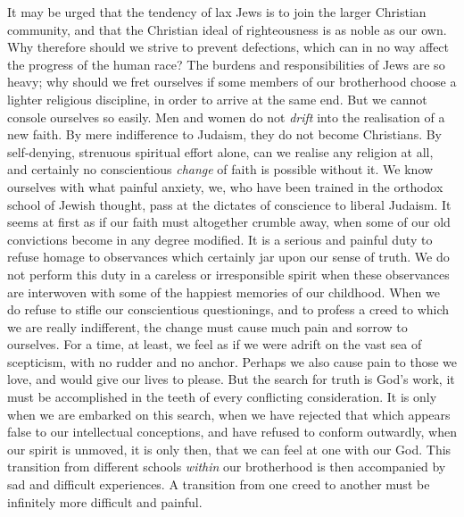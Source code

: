 It may be urged that the tendency of lax
Jews is to join the larger Christian community,
and that the Christian ideal of righteousness
is as noble as our own. Why therefore
should we strive to prevent defections, which
can in no way affect the progress of the
human race? The burdens and responsibilities
of Jews are so heavy; why should we
fret ourselves if some members of our
brotherhood choose a lighter religious
discipline, in order to arrive at the same end.
But we cannot console ourselves so easily.
Men and women do not \textsl{drift} into the
realisation of a new faith. By mere indifference
to Judaism, they do not become Christians.
By self-denying, strenuous spiritual
effort alone, can we realise any religion at all,
and certainly no conscientious \textsl{change} of faith
is possible without it. We know ourselves
with what painful anxiety, we, who have been
trained in the orthodox school of Jewish
thought, pass at the dictates of conscience to
liberal Judaism. It seems at first as if our
faith must altogether crumble away, when
some of our old convictions become in any
degree modified. It is a serious and painful
duty to refuse homage to observances which
certainly jar upon our sense of truth. We do
not perform this duty in a careless or irresponsible
spirit when these observances are interwoven
with some of the happiest memories
of our childhood. When we do refuse to stifle
our conscientious questionings, and to profess
a creed to which we are really indifferent, the
change must cause much pain and sorrow to
ourselves. For a time, at least, we feel as if
we were adrift on the vast sea of scepticism,
with no rudder and no anchor. Perhaps we
also cause pain to those we love, and would
give our lives to please. But the search for
truth is God’s work, it must be accomplished
in the teeth of every conflicting consideration.
It is only when we are embarked on this
search, when we have rejected that which
appears false to our intellectual conceptions,
and have refused to conform outwardly, when
our spirit is unmoved, it is only then, that we
can feel at one with our God. This transition
from different schools \textsl{within} our
brotherhood is then accompanied by sad
and difficult experiences. A transition from
one creed to another must be infinitely
more difficult and painful.

